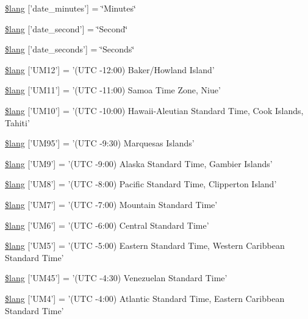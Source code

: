 \begin{DoxyCompactItemize}
\hyperlink{date__lang_8php_ab41862e6c3ef784a6e32992cfb9a6e1c}{\$lang} \mbox{[}'date\-\_\-minutes'\mbox{]} = \char`\"{}Minutes\char`\"{}
\item 
\hyperlink{date__lang_8php_ac1b67b9034a78d631bf5302df6105136}{\$lang} \mbox{[}'date\-\_\-second'\mbox{]} = \char`\"{}Second\char`\"{}
\item 
\hyperlink{date__lang_8php_a0a75c76e6e4be09a6c5f1a1727fa2c78}{\$lang} \mbox{[}'date\-\_\-seconds'\mbox{]} = \char`\"{}Seconds\char`\"{}
\item 
\hyperlink{date__lang_8php_aa03db528f49f0bdd57489a7e057a95dc}{\$lang} \mbox{[}'U\-M12'\mbox{]} = '(U\-T\-C -\/12\-:00) Baker/Howland Island'
\item 
\hyperlink{date__lang_8php_a2257b69398113162bdafb48f1bab4973}{\$lang} \mbox{[}'U\-M11'\mbox{]} = '(U\-T\-C -\/11\-:00) Samoa Time Zone, Niue'
\item 
\hyperlink{date__lang_8php_a671d507e120e16f7e7718be0ed0aea74}{\$lang} \mbox{[}'U\-M10'\mbox{]} = '(U\-T\-C -\/10\-:00) Hawaii-\/Aleutian Standard Time, Cook Islands, Tahiti'
\item 
\hyperlink{date__lang_8php_a7cd7a4418ccf42c7daae2a098ba8f9e6}{\$lang} \mbox{[}'U\-M95'\mbox{]} = '(U\-T\-C -\/9\-:30) Marquesas Islands'
\item 
\hyperlink{date__lang_8php_a5509302f8ddd971cb58e1f49f012bbac}{\$lang} \mbox{[}'U\-M9'\mbox{]} = '(U\-T\-C -\/9\-:00) Alaska Standard Time, Gambier Islands'
\item 
\hyperlink{date__lang_8php_ab3ed4c273fcb61197ef7d8e4bae07415}{\$lang} \mbox{[}'U\-M8'\mbox{]} = '(U\-T\-C -\/8\-:00) Pacific Standard Time, Clipperton Island'
\item 
\hyperlink{date__lang_8php_aa642f12cf461f915682b17c0c30b2475}{\$lang} \mbox{[}'U\-M7'\mbox{]} = '(U\-T\-C -\/7\-:00) Mountain Standard Time'
\item 
\hyperlink{date__lang_8php_a30f39dd7748d488f4a0140751336d257}{\$lang} \mbox{[}'U\-M6'\mbox{]} = '(U\-T\-C -\/6\-:00) Central Standard Time'
\item 
\hyperlink{date__lang_8php_a557150a51633e11dc49e3bfd2e1c091e}{\$lang} \mbox{[}'U\-M5'\mbox{]} = '(U\-T\-C -\/5\-:00) Eastern Standard Time, Western Caribbean Standard Time'
\item 
\hyperlink{date__lang_8php_aac9f8a1e0da4b3cee00a19fe9ac642d0}{\$lang} \mbox{[}'U\-M45'\mbox{]} = '(U\-T\-C -\/4\-:30) Venezuelan Standard Time'
\item 
\hyperlink{date__lang_8php_a42f66872f4a082bcb2ee004bd2716828}{\$lang} \mbox{[}'U\-M4'\mbox{]} = '(U\-T\-C -\/4\-:00) Atlantic Standard Time, Eastern Caribbean Standard Time'

\end{DoxyCompactItemize}
